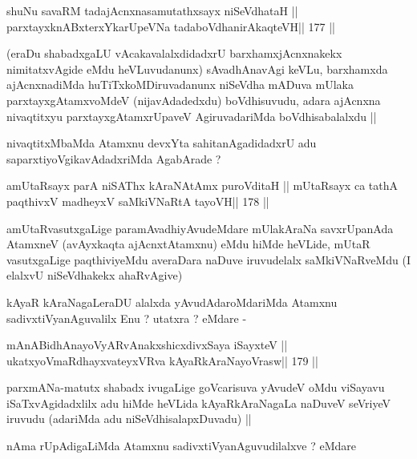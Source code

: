 \begin{shl}
shuNu savaRM tadajAcnxnasamutathxsayx niSeVdhataH ||
parxtayxknABxterxYkarUpeVNa tadaboVdhanirAkaqteVH\hfill || 177 ||
\end{shl}

\begin{artha}
(eraDu shabadxgaLU vAcakavalalxdidadxrU barxhamxjAcnxnakekx
  nimitatxvAgide eMdu heVLuvudanunx) sAvadhAnavAgi keVLu, barxhamxda
  ajAcnxnadiMda huTiTxkoMDiruvadanunx niSeVdha mADuva mUlaka
  parxtayxgAtamxvoMdeV (nijavAdadedxdu)  boVdhisuvudu, adara ajAcnxna
  nivaqtitxyu parxtayxgAtamxrUpaveV AgiruvadariMda boVdhisabalalxdu ||
\end{artha}

\begin{artha}
nivaqtitxMbaMda Atamxnu devxYta sahitanAgadidadxrU adu
saparxtiyoVgikavAdadxriMda AgabArade ?
\end{artha}

\begin{shl}
amUtaRsayx parA niSAThx kAraNAtAmx puroVditaH ||
mUtaRsayx ca tathA paqthivxV madheyxV saMkiVNaRtA tayoVH\hfill || 178 ||
\end{shl}

\begin{artha}
amUtaRvasutxgaLige paramAvadhiyAvudeMdare mUlakAraNa savxrUpanAda
AtamxneV (avAyxkaqta ajAcnxtAtamxnu) eMdu hiMde heVLide, mUtaR
vasutxgaLige paqthiviyeMdu averaDara naDuve iruvudelalx saMkiVNaRveMdu
(I elalxvU niSeVdhakekx ahaRvAgive)
\end{artha}

\begin{artha}
kAyaR kAraNagaLeraDU alalxda yAvudAdaroMdariMda Atamxnu
sadivxtiVyanAguvalilx Enu ? utatxra ? eMdare -
\end{artha}

\begin{shl}
mAnABidhAnayoVyARvAnakxshicxdivxSaya iSayxteV ||
ukatxyoVmaRdhayxvateyxVRva kAyaRkAraNayoVrasw\hfill || 179 ||
\end{shl}

\begin{artha}
parxmANa-matutx shabadx ivugaLige goVcarisuva yAvudeV oMdu viSayavu
iSaTxvAgidadxlilx adu hiMde heVLida kAyaRkAraNagaLa naDuveV seVriyeV
iruvudu (adariMda adu niSeVdhisalapxDuvadu) ||
\end{artha}

\begin{artha}
nAma rUpAdigaLiMda Atamxnu sadivxtiVyanAguvudilalxve ? eMdare 
\end{artha}

